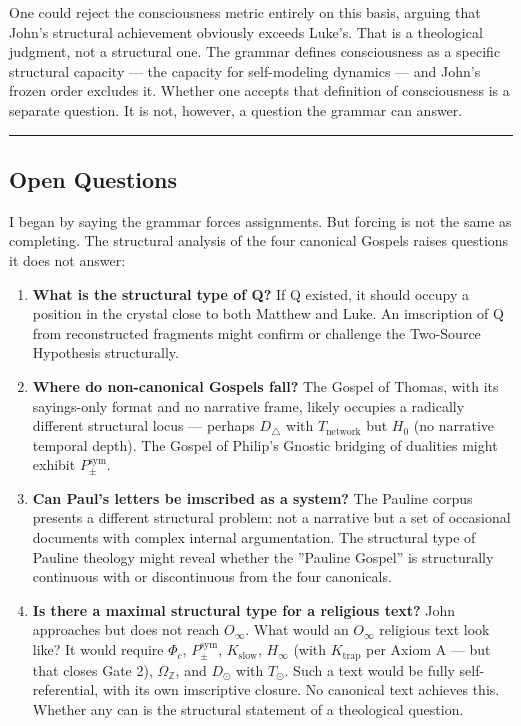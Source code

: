 \documentclass[12pt,a4paper]{article}
\begin{document}
One could reject the consciousness metric entirely on this basis, arguing that John's structural achievement obviously exceeds Luke's. That is a theological judgment, not a structural one. The grammar defines consciousness as a specific structural capacity --- the capacity for self-modeling dynamics --- and John's frozen order excludes it. Whether one accepts that definition of consciousness is a separate question. It is not, however, a question the grammar can answer.

\begin{center}
\rule{0.5\textwidth}{0.4pt}
\end{center}

\subsection{Open Questions}

I began by saying the grammar forces assignments. But forcing is not the same as completing. The structural analysis of the four canonical Gospels raises questions it does not answer:

\begin{enumerate}
    \item \textbf{What is the structural type of Q?} If Q existed, it should occupy a position in the crystal close to both Matthew and Luke. An imscription of Q from reconstructed fragments might confirm or challenge the Two-Source Hypothesis structurally.
    \item \textbf{Where do non-canonical Gospels fall?} The Gospel of Thomas, with its sayings-only format and no narrative frame, likely occupies a radically different structural locus --- perhaps $D_{\triangle}$ with $T_\text{network}$ but $H_0$ (no narrative temporal depth). The Gospel of Philip's Gnostic bridging of dualities might exhibit $P_{\pm}^{\text{sym}}$.
    \item \textbf{Can Paul's letters be imscribed as a system?} The Pauline corpus presents a different structural problem: not a narrative but a set of occasional documents with complex internal argumentation. The structural type of Pauline theology might reveal whether the ''Pauline Gospel'' is structurally continuous with or discontinuous from the four canonicals.
    \item \textbf{Is there a maximal structural type for a religious text?} John approaches but does not reach $O_{\infty}$. What would an $O_{\infty}$ religious text look like? It would require $\Phi_c$, $P_{\pm}^{\text{sym}}$, $K_\text{slow}$, $H_{\infty}$ (with $K_\text{trap}$ per Axiom A --- but that closes Gate 2), $\Omega_\mathbb{Z}$, and $D_{\odot}$ with $T_{\odot}$. Such a text would be fully self-referential, with its own imscriptive closure. No canonical text achieves this. Whether any can is the structural statement of a theological question.
\end{enumerate}
\end{document}
